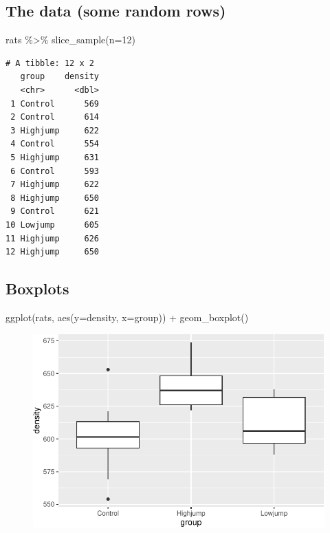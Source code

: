 \documentclass[
  letterpaper,
  DIV=11,
  numbers=noendperiod]{scrartcl}
\newenvironment{Shaded}{\begin{snugshade}}{\end{snugshade}}
\newcommand{\AttributeTok}[1]{\textcolor[rgb]{0.40,0.45,0.13}{#1}}
\newcommand{\DecValTok}[1]{\textcolor[rgb]{0.68,0.00,0.00}{#1}}
\newcommand{\FunctionTok}[1]{\textcolor[rgb]{0.28,0.35,0.67}{#1}}
\newcommand{\NormalTok}[1]{\textcolor[rgb]{0.00,0.23,0.31}{#1}}
\newcommand{\SpecialCharTok}[1]{\textcolor[rgb]{0.37,0.37,0.37}{#1}}
\begin{document}
\normalsize

\hypertarget{the-data-some-random-rows}{%
\subsection{The data (some random
rows)}\label{the-data-some-random-rows}}

\small

\begin{Shaded}
\begin{Highlighting}[]
\NormalTok{rats }\SpecialCharTok{\%\textgreater{}\%} \FunctionTok{slice\_sample}\NormalTok{(}\AttributeTok{n=}\DecValTok{12}\NormalTok{)}
\end{Highlighting}
\end{Shaded}

\begin{verbatim}
# A tibble: 12 x 2
   group    density
   <chr>      <dbl>
 1 Control      569
 2 Control      614
 3 Highjump     622
 4 Control      554
 5 Highjump     631
 6 Control      593
 7 Highjump     622
 8 Highjump     650
 9 Control      621
10 Lowjump      605
11 Highjump     626
12 Highjump     650
\end{verbatim}

\normalsize

\hypertarget{boxplots}{%
\subsection{Boxplots}\label{boxplots}}

\begin{Shaded}
\begin{Highlighting}[]
\FunctionTok{ggplot}\NormalTok{(rats, }\FunctionTok{aes}\NormalTok{(}\AttributeTok{y=}\NormalTok{density, }\AttributeTok{x=}\NormalTok{group)) }\SpecialCharTok{+} \FunctionTok{geom\_boxplot}\NormalTok{()}
\end{Highlighting}
\end{Shaded}

\begin{figure}[H]

{\centering \includegraphics{inference_5_files/figure-pdf/inference-5-R-11-1.pdf}

}

\end{figure}
\end{document}
